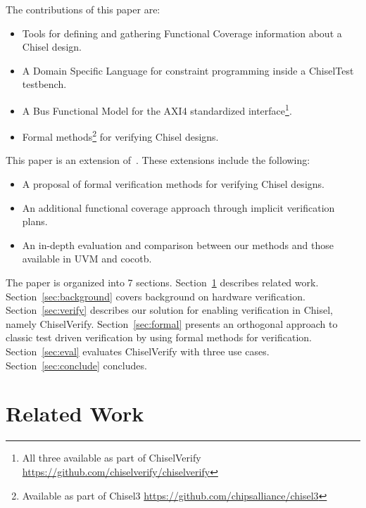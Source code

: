 \documentclass[conference]{IEEEtran}
\newcommand{\todo}[1]{{\color{olive} TODO: #1}}
\newcommand{\martin}[1]{{\color{blue} Martin: #1}}
\newcommand{\hjd}[1]{{\color{pink} Hans: #1}}
\begin{document}
The contributions of this paper are:
\begin{itemize}
	\item Tools for defining and gathering Functional Coverage information about a Chisel design.
	\item A Domain Specific Language for constraint programming inside a ChiselTest testbench.
	\item A Bus Functional Model for the AXI4 standardized interface\footnote{All three available as part of ChiselVerify \url{https://github.com/chiselverify/chiselverify}}.
	\item Formal methods\footnote{Available as part of Chisel3 \url{https://github.com/chipsalliance/chisel3}} for verifying Chisel designs.
\end{itemize}

This paper is an extension of~\cite{ChiselVerify:2021}.
These extensions include the following:

\begin{itemize}
	\item A proposal of formal verification methods for verifying Chisel designs.
	\item An additional functional coverage approach through implicit verification plans.
	\item An in-depth evaluation and comparison between our methods and those available in UVM and cocotb.
\end{itemize}

The paper is organized into 7 sections.
Section~\ref{sec:related} describes related work.
Section~\ref{sec:background} covers background on hardware verification.
Section~\ref{sec:verify} describes our solution for enabling verification in Chisel, namely ChiselVerify.
Section~\ref{sec:formal} presents an orthogonal approach to classic test driven verification by using formal
methods for verification. 
Section~\ref{sec:eval} evaluates ChiselVerify with three use cases.
Section~\ref{sec:conclude} concludes.


\section{Related Work}
\label{sec:related}
\end{document}
